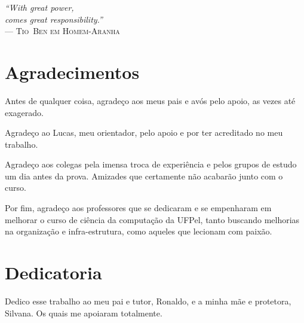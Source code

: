 \clearpage
\begin{flushright}
\mbox{}\vfill
{\sffamily\itshape
``With great power,\\
comes great responsibility.''\\}
--- \textsc{Tio~Ben em Homem-Aranha}
\end{flushright}

\chapter*{Agradecimentos}

Antes de qualquer coisa, agradeço aos meus pais e avós pelo apoio, as vezes até exagerado.

Agradeço ao Lucas, meu orientador, pelo apoio e por ter acreditado no meu trabalho.

Agradeço aos colegas pela imensa troca de experiência e pelos grupos de estudo um dia antes da prova. Amizades que certamente não acabarão junto com o curso.

Por fim, agradeço aos professores que se dedicaram e se empenharam em melhorar o curso de ciência da computação da UFPel, tanto buscando melhorias na organização e infra-estrutura, como aqueles que lecionam com paixão.

\chapter*{Dedicatoria}

Dedico esse trabalho ao meu pai e tutor, Ronaldo, e a minha mãe e protetora, Silvana. Os quais me apoiaram totalmente.